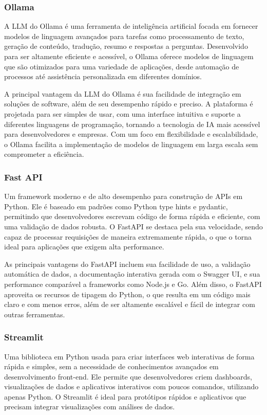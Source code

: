 \documentclass[a4paper, 12pt]{article}
\begin{document}
    \subsubsection{Ollama}
    A LLM do Ollama é uma ferramenta de inteligência artificial focada em fornecer modelos de linguagem avançados para tarefas como processamento de texto, geração de conteúdo, tradução, resumo e respostas a perguntas. Desenvolvido para ser altamente eficiente e acessível, o Ollama oferece modelos de linguagem que são otimizados para uma variedade de aplicações, desde automação de processos até assistência personalizada em diferentes domínios.

    A principal vantagem da LLM do Ollama é sua facilidade de integração em soluções de software, além de seu desempenho rápido e preciso. A plataforma é projetada para ser simples de usar, com uma interface intuitiva e suporte a diferentes linguagens de programação, tornando a tecnologia de IA mais acessível para desenvolvedores e empresas. Com um foco em flexibilidade e escalabilidade, o Ollama facilita a implementação de modelos de linguagem em larga escala sem comprometer a eficiência.

    \subsubsection{Fast API}
    Um framework moderno e de alto desempenho para construção de APIs em Python. Ele é baseado em padrões como Python type hints e pydantic, permitindo que desenvolvedores escrevam código de forma rápida e eficiente, com uma validação de dados robusta. O FastAPI se destaca pela sua velocidade, sendo capaz de processar requisições de maneira extremamente rápida, o que o torna ideal para aplicações que exigem alta performance.

    As principais vantagens do FastAPI incluem sua facilidade de uso, a validação automática de dados, a documentação interativa gerada com o Swagger UI, e sua performance comparável a frameworks como Node.js e Go. Além disso, o FastAPI aproveita os recursos de tipagem do Python, o que resulta em um código mais claro e com menos erros, além de ser altamente escalável e fácil de integrar com outras ferramentas.

    \subsubsection{Streamlit}
    Uma biblioteca em Python usada para criar interfaces web interativas de forma rápida e simples, sem a necessidade de conhecimentos avançados em desenvolvimento front-end. Ele permite que desenvolvedores criem dashboards, visualizações de dados e aplicativos interativos com poucos comandos, utilizando apenas Python. O Streamlit é ideal para protótipos rápidos e aplicativos que precisam integrar visualizações com análises de dados.
\end{document}

